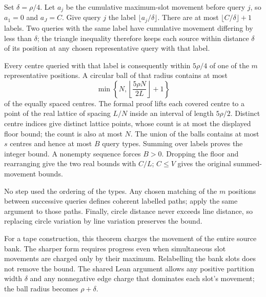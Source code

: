 \begin{outline}
Set $\delta=\rho/4$.  Let $a_j$ be the cumulative maximum-slot movement
before query $j$, so $a_1=0$ and $a_J=C$.  Give query $j$ the label
$\lfloor a_j/\delta\rfloor$.  There are at most
$\lfloor C/\delta\rfloor+1$ labels.  Two queries with the same label
have cumulative movement differing by less than $\delta$; the triangle
inequality therefore keeps each source within distance $\delta$ of its
position at any chosen representative query with that label.

Every centre queried with that label is consequently within $5\rho/4$
of one of the $m$ representative positions.  A circular ball of that
radius contains at most
\[
 \min\left\{N,\left\lfloor\frac{5\rho N}{2L}\right\rfloor+1\right\}
\]
of the equally spaced centres.  The formal proof lifts each covered
centre to a point of the real lattice of spacing $L/N$ inside an interval
of length $5\rho/2$.  Distinct centre indices give distinct lattice
points, whose count is at most the displayed floor bound; the count is
also at most $N$.  The union of the balls contains at most $s$ centres
and hence at most $B$ query types.  Summing over labels proves the integer
bound.  A nonempty sequence forces $B>0$.  Dropping the floor and
rearranging give the two real bounds with $C/L$; $C\le V$ gives the
original summed-movement bounds.

No step used the ordering of the types.  Any chosen matching of the $m$
positions between successive queries defines coherent labelled paths;
apply the same argument to those paths.  Finally, circle distance never
exceeds line distance, so replacing circle variation by line variation
preserves the bound.
\end{outline}

For a tape construction, this theorem charges the movement of the entire
source bank.  The sharper form requires progress even when simultaneous
slot movements are charged only by their maximum.  Relabelling the bank
slots does not remove the bound.  The shared Lean argument allows any
positive partition width $\delta$ and any nonnegative edge charge that
dominates each slot's movement; the ball radius becomes $\rho+\delta$.


